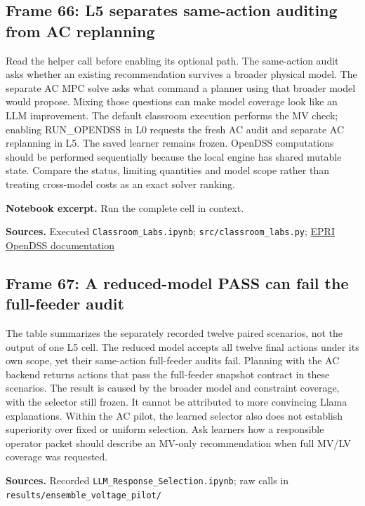 \documentclass[11pt]{article}
\begin{document}
\subsection*{Frame 66: L5 separates same-action auditing from AC replanning}
Read the helper call before enabling its optional path. The same-action audit asks whether an existing recommendation survives a broader physical model. The separate AC MPC solve asks what command a planner using that broader model would propose. Mixing those questions can make model coverage look like an LLM improvement. The default classroom execution performs the MV check; enabling RUN\_OPENDSS in L0 requests the fresh AC audit and separate AC replanning in L5. The saved learner remains frozen. OpenDSS computations should be performed sequentially because the local engine has shared mutable state. Compare the status, limiting quantities and model scope rather than treating cross-model costs as an exact solver ranking.\par
\par\noindent\begin{minipage}{\linewidth}\textbf{Notebook excerpt.} Run the complete cell in context.\par \end{minipage}\par
\par\nopagebreak\begin{minipage}{\linewidth}{\footnotesize\color{slate}\textbf{Sources.} Executed \texttt{Classroom\_Labs.ipynb}; \texttt{src/classroom\_labs.py}; \href{https://opendss.epri.com/}{EPRI OpenDSS documentation}\par}\end{minipage}\par\medskip
\subsection*{Frame 67: A reduced-model PASS can fail the full-feeder audit}
The table summarizes the separately recorded twelve paired scenarios, not the output of one L5 cell. The reduced model accepts all twelve final actions under its own scope, yet their same-action full-feeder audits fail. Planning with the AC backend returns actions that pass the full-feeder snapshot contract in these scenarios. The result is caused by the broader model and constraint coverage, with the selector still frozen. It cannot be attributed to more convincing Llama explanations. Within the AC pilot, the learned selector also does not establish superiority over fixed or uniform selection. Ask learners how a responsible operator packet should describe an MV-only recommendation when full MV/LV coverage was requested.\par
\par\nopagebreak\begin{minipage}{\linewidth}{\footnotesize\color{slate}\textbf{Sources.} Recorded \texttt{LLM\_Response\_Selection.ipynb}; raw calls in \texttt{results/ensemble\_voltage\_pilot/}\par}\end{minipage}\par\medskip
\end{document}
